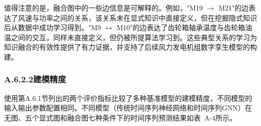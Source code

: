 值得注意的是，融合图中的一些边信息是可解释的。例如，"M19 $\rightarrow$ M21"的边表达了风速与功率之间的关系，该关系未在显式知识中直接定义，但在挖掘隐式知识后从数据中成功学习得到。"M9 $\leftrightarrow$ M10"的边表达了齿轮箱轴承温度与齿轮箱油温之间的交互，同样未直接定义，但仍被所提算法学习到。这些典型关系的学习为知识融合的有效性提供了有力证据，并支持了后续风力发电机组数字孪生模型的构建。

\subsubsection*{A.6.2.2\quad 建模精度}

使用第A.6.1节列出的两个评价指标比较了多种基准模型的建模精度，不同模型的输入输出参数配置相同。不同模型（传统时间序列神经网络和时间序列GNN）在无图、五个显式图和融合图七种条件下的时间序列预测结果如表~A-4所示。

